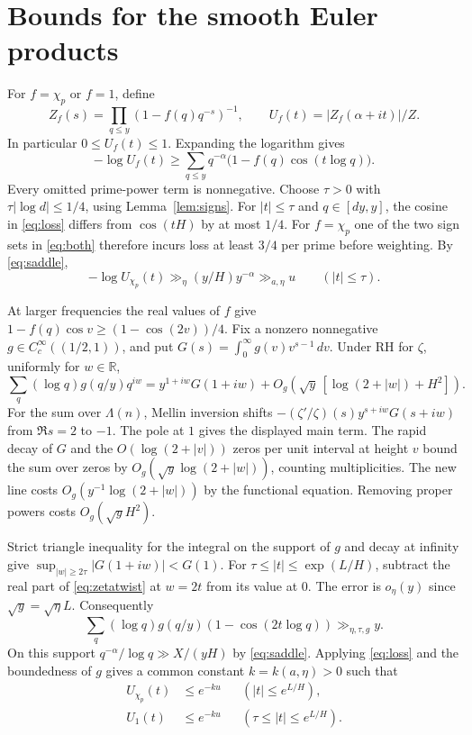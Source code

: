 \documentclass[11pt]{article}
\newcommand{\ch}{\chi_p}
\begin{document}
\section{Bounds for the smooth Euler products}
For \(f=\ch\) or \(f=1\), define
\[
 Z_f(s)=\prod_{q\le y}(1-f(q)q^{-s})^{-1},\qquad
 U_f(t)=|Z_f(\alpha+it)|/Z .
\]
In particular \(0\le U_f(t)\le1\). Expanding the logarithm gives
\begin{equation}\label{eq:loss}
 -\log U_f(t)\ge
       \sum_{q\le y}q^{-\alpha}\bigl(1-f(q)\cos(t\log q)\bigr).
\end{equation}
Every omitted prime-power term is nonnegative. Choose \(\tau>0\)
with \(\tau|\log d|\le1/4\), using Lemma~\ref{lem:signs}. For
\(|t|\le\tau\) and \(q\in[dy,y]\), the cosine in \eqref{eq:loss}
differs from \(\cos(tH)\) by at most \(1/4\). For \(f=\ch\) one of
the two sign sets in \eqref{eq:both} therefore incurs loss at least
\(3/4\) per prime before weighting. By \eqref{eq:saddle},
\[
 -\log U_{\ch}(t)\gg_\eta (y/H)y^{-\alpha}\gg_{a,\eta}u
 \qquad (|t|\le\tau).
\]

At larger frequencies the real values of \(f\) give
\(1-f(q)\cos v\ge(1-\cos(2v))/4\). Fix a nonzero nonnegative
\(g\in C_c^\infty((1/2,1))\), and put
\(G(s)=\int_0^\infty g(v)v^{s-1}\,dv\). Under RH for \(\zeta\),
uniformly for \(w\in\mathbb R\),
\begin{equation}\label{eq:zetatwist}
 \sum_q(\log q)g(q/y)q^{iw}
 =y^{1+iw}G(1+iw)
   +O_g\!\left(\sqrt y\,[\log(2+|w|)+H^2]\right).
\end{equation}
For the sum over \(\Lambda(n)\), Mellin inversion shifts
\(-(\zeta'/\zeta)(s)y^{s+iw}G(s+iw)\) from \(\Re s=2\) to \(-1\).
The pole at \(1\) gives the displayed main term. The rapid decay of
\(G\) and the \(O(\log(2+|v|))\) zeros per unit interval at height \(v\)
bound the sum over zeros by \(O_g(\sqrt y\log(2+|w|))\), counting
multiplicities. The new line costs \(O_g(y^{-1}\log(2+|w|))\) by the
functional equation. Removing proper powers costs \(O_g(\sqrt y H^2)\).

Strict triangle inequality for the integral on the support of \(g\)
and decay at infinity give
\(\sup_{|w|\ge2\tau}|G(1+iw)|<G(1)\). For
\(\tau\le |t|\le\exp(L/H)\), subtract the real part of
\eqref{eq:zetatwist} at \(w=2t\) from its value at \(0\). The error
is \(o_\eta(y)\) since \(\sqrt y=\sqrt\eta L\). Consequently
\[
 \sum_q(\log q)g(q/y)(1-\cos(2t\log q))\gg_{\eta,\tau,g} y .
\]
On this support \(q^{-\alpha}/\log q\gg X/(yH)\) by
\eqref{eq:saddle}. Applying \eqref{eq:loss} and the boundedness of \(g\)
gives a common constant \(k=k(a,\eta)>0\) such that
\begin{align}
 U_{\ch}(t)&\le e^{-ku}
       &&(|t|\le e^{L/H}),\label{eq:signed}\\
 U_1(t)&\le e^{-ku}
       &&(\tau\le |t|\le e^{L/H}).\label{eq:unsigned}
\end{align}
\end{document}
